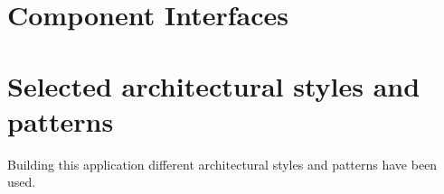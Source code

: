  \section{Component Interfaces}
 	\blindtext
\begin{comment}
 PDO: PHP Data Objects used by the BLL to communicate with the DAL.
 	RESTful API with JSON used by clients ( both mobile apps and web
browsers ) to interact with the BLL. API calls that need authentication are
required to authenticate via HTTP basic authentication for each request. exchanged
data will be secured using SSL.
as now ( v1 ) our exposed methods are the following:
• api/v1/driver [auth]
– GET: get driver info
– PATCH/PUT: update driver data ( position and available status )
• api/v1/request
– POST: create a new request
• api/v1/reservation
– POST: create a new reservation
• api/v1/ride
– POST: create a new ride
\end{comment}

 \section{Selected architectural styles and patterns}
Building this application different architectural styles and patterns have been used.
